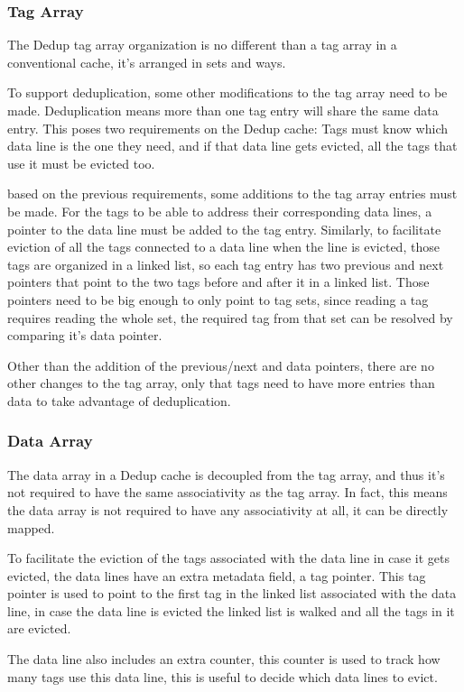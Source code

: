 \subsubsection{Tag Array}
\label{sssec:DedupTag}
The Dedup tag array organization is no different than a tag array in a conventional cache, it's arranged in sets and ways.\par
To support deduplication, some other modifications to the tag array need to be made. Deduplication means more than one tag entry will share the same data entry. This poses two requirements on the Dedup cache: Tags must know which data line is the one they need, and if that data line gets evicted, all the tags that use it must be evicted too.\par
based on the previous requirements, some additions to the tag array entries must be made. For the tags to be able to address their corresponding data lines, a pointer to the data line must be added to the tag entry. Similarly, to facilitate eviction of all the tags connected to a data line when the line is evicted, those tags are organized in a linked list, so each tag entry has two previous and next pointers that point to the two tags before and after it in a linked list. Those pointers need to be big enough to only point to tag sets, since reading a tag requires reading the whole set, the required tag from that set can be resolved by comparing it's data pointer.\par
Other than the addition of the previous/next and data pointers, there are no other changes to the tag array, only that tags need to have more entries than data to take advantage of deduplication.
\subsubsection{Data Array}
\label{sssec:DedupData}
The data array in a Dedup cache is decoupled from the tag array, and thus it's not required to have the same associativity as the tag array. In fact, this means the data array is not required to have any associativity at all, it can be directly mapped.\par
To facilitate the eviction of the tags associated with the data line in case it gets evicted, the data lines have an extra metadata field, a tag pointer. This tag pointer is used to point to the first tag in the linked list associated with the data line, in case the data line is evicted the linked list is walked and all the tags in it are evicted.\par
The data line also includes an extra counter, this counter is used to track how many tags use this data line, this is useful to decide which data lines to evict.

